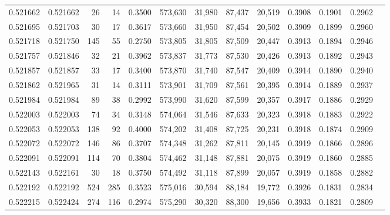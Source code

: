 \begin{tabular}{rrrrrrrrrrrrr}
0.521662 & 0.521662 &    26 &    14 &                                     0.3500 & 573,630 &  31,980 &  87,437 &  20,519 & 0.3908 & 0.1901 & 0.2962 \\
0.521695 & 0.521703 &    30 &    17 &                                     0.3617 & 573,660 &  31,950 &  87,454 &  20,502 & 0.3909 & 0.1899 & 0.2960 \\
0.521718 & 0.521750 &   145 &    55 &                                     0.2750 & 573,805 &  31,805 &  87,509 &  20,447 & 0.3913 & 0.1894 & 0.2946 \\
0.521757 & 0.521846 &    32 &    21 &                                     0.3962 & 573,837 &  31,773 &  87,530 &  20,426 & 0.3913 & 0.1892 & 0.2943 \\
0.521857 & 0.521857 &    33 &    17 &                                     0.3400 & 573,870 &  31,740 &  87,547 &  20,409 & 0.3914 & 0.1890 & 0.2940 \\
0.521862 & 0.521965 &    31 &    14 &                                     0.3111 & 573,901 &  31,709 &  87,561 &  20,395 & 0.3914 & 0.1889 & 0.2937 \\
0.521984 & 0.521984 &    89 &    38 &                                     0.2992 & 573,990 &  31,620 &  87,599 &  20,357 & 0.3917 & 0.1886 & 0.2929 \\
0.522003 & 0.522003 &    74 &    34 &                                     0.3148 & 574,064 &  31,546 &  87,633 &  20,323 & 0.3918 & 0.1883 & 0.2922 \\
0.522053 & 0.522053 &   138 &    92 &                                     0.4000 & 574,202 &  31,408 &  87,725 &  20,231 & 0.3918 & 0.1874 & 0.2909 \\
0.522072 & 0.522072 &   146 &    86 &                                     0.3707 & 574,348 &  31,262 &  87,811 &  20,145 & 0.3919 & 0.1866 & 0.2896 \\
0.522091 & 0.522091 &   114 &    70 &                                     0.3804 & 574,462 &  31,148 &  87,881 &  20,075 & 0.3919 & 0.1860 & 0.2885 \\
0.522143 & 0.522161 &    30 &    18 &                                     0.3750 & 574,492 &  31,118 &  87,899 &  20,057 & 0.3919 & 0.1858 & 0.2882 \\
0.522192 & 0.522192 &   524 &   285 &                                     0.3523 & 575,016 &  30,594 &  88,184 &  19,772 & 0.3926 & 0.1831 & 0.2834 \\
0.522215 & 0.522424 &   274 &   116 &                                     0.2974 & 575,290 &  30,320 &  88,300 &  19,656 & 0.3933 & 0.1821 & 0.2809 \\

\end{tabular}
